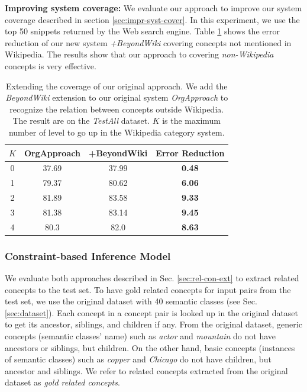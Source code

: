 \vspace*{2 mm}

{\bf Improving system coverage:} We evaluate our approach to improve
our system coverage described in section \ref{sec:impr-syst-cover}. In
this experiment, we use the top 50 snippets returned by the Web search
engine.  Table \ref{tab:exp-beyond-wiki} shows the error reduction of
our new system {\em +BeyondWiki} covering concepts not mentioned in
Wikipedia. The results show that our approach to covering {\em
  non-Wikipedia} concepts is very effective.

\begin{table}[t]
\begin{center}
\begin{tabular}{|c||c|c|c|}
  \hline
  $K$   &  OrgApproach &  +BeyondWiki  &  Error Reduction  \\
  \hline
  0  &             37.69  &             37.99  &        \textbf{0.48}  \\
  1  &             79.37  &             80.62  &        \textbf{6.06}  \\
  2  &             81.89  &             83.58  &        \textbf{9.33}  \\
  3  &             81.38  &             83.14  &        \textbf{9.45}  \\
  4  &             80.3  &              82.0  &        \textbf{8.63}  \\
  \hline
\end{tabular}
\end{center}
\caption{Extending the coverage of our original approach. We add the 
  {\em BeyondWiki} extension to our original system {\em OrgApproach} to 
  recognize the relation between concepts outside Wikipedia.
  The result are on the {\em TestAll} dataset. 
  $K$ is the maximum number of level to go up in the Wikipedia category system.}
\label{tab:exp-beyond-wiki}
\end{table}

\subsubsection{Constraint-based Inference Model}

We evaluate both approaches described in Sec. \ref{sec:rel-con-ext} to
extract related concepts to the test set. To have gold related
concepts for input pairs from the test set, we use the original
dataset with 40 semantic classes (see Sec. \ref{sec:dataset}). Each
concept in a concept pair is looked up in the original dataset to get
its ancestor, siblings, and children if any. From the original
dataset, generic concepts (semantic classes' name) such as {\em actor}
and {\em mountain} do not have ancestors or siblings, but children. On
the other hand, basic concepts (instances of semantic classes) such as
{\em copper} and {\em Chicago} do not have children, but ancestor and
siblings. We refer to related concepts extracted from the original
dataset as {\em gold related concepts}.

